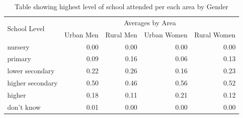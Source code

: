 \documentclass[stu, 12pt, floatsintext,longtable]{apa7}
\begin{document}
\begin{table}[]
    \centering
    \begin{tabular}{@{}lrrrr@{}}
        \toprule
        \multirow{2}{*}{School Level} & \multicolumn{4}{c}{Averages by Area}

        \\
                                      & \multicolumn{1}{l}{Urban Men}        &
        \multicolumn{1}{l}{Rural Men} & \multicolumn{1}{l}{Urban Women}      &
        \multicolumn{1}{l}{Rural Women}
        \\
        \midrule
        nursery                       & 0.00                                 &
        0.00
                                      & 0.00                                 &
        0.00
        \\
        primary                       & 0.09                                 &
        0.16
                                      & 0.06                                 &
        0.13
        \\
        lower secondary               & 0.22                                 &
        0.26
                                      & 0.16                                 &
        0.23
        \\
        higher secondary              & 0.50                                 &
        0.46
                                      & 0.56                                 &
        0.52
        \\
        higher                        & 0.18                                 &
        0.11
                                      & 0.21                                 &
        0.12
        \\
        don't know                    & 0.01                                 &
        0.00
                                      & 0.00                                 &
        0.00
        \\
        \bottomrule
    \end{tabular}
    \caption{Table showing highest level of school attended per each area
        by Gender}
\end{table}
\end{document}
